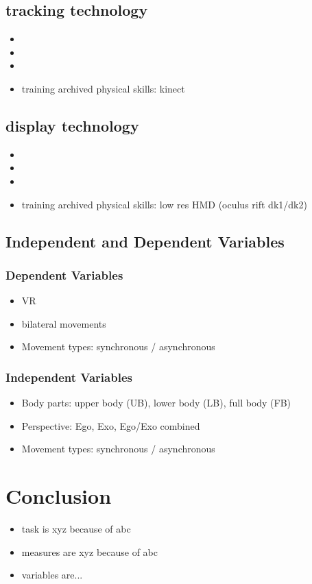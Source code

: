 \subsection{tracking technology}
\begin{itemize}
	\item 
	\item 
	\item 
	\item training archived physical skills: kinect
\end{itemize}
\subsection{display technology}
\begin{itemize}
	\item
	\item 
	\item 
	\item training archived physical skills: low res HMD (oculus rift dk1/dk2)
\end{itemize}
\subsection{Independent and Dependent Variables}
\subsubsection{Dependent Variables}
\begin{itemize}
	\item VR
	\item bilateral movements
	\item Movement types: synchronous  / asynchronous 
\end{itemize}
\subsubsection{Independent Variables}
\begin{itemize}
	\item Body parts: upper body (UB), lower body (LB), full body (FB)
	\item Perspective: Ego, Exo, Ego/Exo combined
	\item Movement types: synchronous  / asynchronous 
\end{itemize}

\section{Conclusion}
\begin{itemize}
	\item task is xyz because of abc
	\item measures are xyz because of abc
	\item variables are...
\end{itemize}
